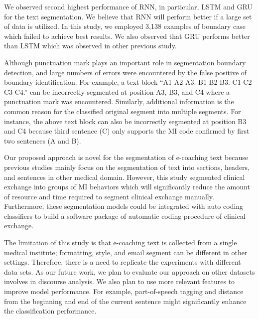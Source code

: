 \documentclass{amia}
\begin{document}
We observed second highest performance of RNN, in particular, LSTM and GRU for the text segmentation. We believe that RNN will perform better if a large set of data is utilized. In this study, we employed 3,138 examples of boundary case which failed to achieve best results. We also observed that GRU performs better than LSTM which was observed in other previous study\cite{chung2014empirical}.

Although punctuation mark plays an important role in segmentation boundary detection, and large numbers of errors were encountered by the false positive of boundary identification. For example, a text block ``A1 A2 A3. B1 B2 B3. C1 C2 C3 C4.'' can be incorrectly segmented at position A3, B3, and C4 where a punctuation mark was encountered. Similarly, additional information is the common reason for the classified original segment into multiple segments. For instance, the above text block can also be incorrectly segmented at position B3 and C4 because third sentence (C) only supports the MI code confirmed by first two sentences (A and B). 

Our proposed approach is novel for the segmentation of e-coaching text because previous studies mainly focus on the segmentation of text into sections, headers, and sentences in other medical domain. However, this study segmented clinical exchange into groups of MI behaviors which will significantly reduce the amount of resource and time required to segment clinical exchange manually. Furthermore, these segmentation models could be integrated with auto coding classifiers to build a software package of automatic coding procedure of clinical exchange.

The limitation of this study is that e-coaching text is collected from a single medical institute; formatting, style, and email segment can be different in other settings. Therefore, there is a need to replicate the experiments with different data sets. As our future work, we plan to evaluate our approach on other datasets involves in discourse analysis. We also plan to use more relevant features to improve model performance. For example, part-of-speech tagging\cite{hasan2016feedback} and distance from the beginning and end of the current sentence might significantly enhance the classification performance. 
 
\end{document}
